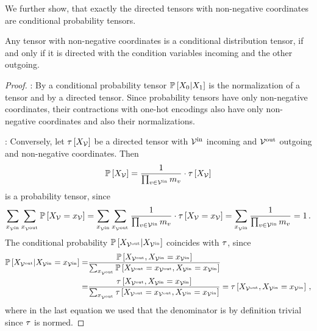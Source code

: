 We further show, that exactly the directed tensors with non-negative coordinates are conditional probability tensors.

\begin{theorem}
    \label{the:conditionalDirected}
    Any tensor with non-negative coordinates is a conditional distribution tensor, if and only if it is directed with the condition variables incoming and the other outgoing.
\end{theorem}
\begin{proof}
    \proofrightsymbol:
    By  a conditional probability tensor $\mathbb{P}\left[X_{0}|X_{1}\right]$ is the normalization of a tensor and by  a directed tensor.
    Since probability tensors have only non-negative coordinates, their contractions with one-hot encodings also have only non-negative coordinates and also their normalizations.

    \proofleftsymbol:
    Conversely, let $\tau\left[X_{\mathcal{V}}\right]$ be a directed tensor with $\mathcal{V}^{\mathrm{in}}$ incoming and $\mathcal{V}^{\mathrm{out}}$ outgoing and non-negative coordinates.
    Then
    \begin{align}
        \mathbb{P}\left[X_{\mathcal{V}}\right] = \frac{1}{\prod_{v\in\mathcal{V}^{\mathrm{in}}}m_{v}} \cdot \tau\left[X_{\mathcal{V}}\right]
    \end{align}
    is a probability tensor, since
    \begin{align*}
        \sum_{x_{\mathcal{V}^{\mathrm{in}}}} \sum_{x_{\mathcal{V}^{\mathrm{out}}}} \mathbb{P}\left[X_{\mathcal{V}}=x_{\mathcal{V}}\right] =
        \sum_{x_{\mathcal{V}^{\mathrm{in}}}} \sum_{x_{\mathcal{V}^{\mathrm{out}}}} \frac{1}{\prod_{v\in\mathcal{V}^{\mathrm{in}}}m_{v}} \cdot \tau\left[X_{\mathcal{V}}=x_{\mathcal{V}}\right] =
        \sum_{x_{\mathcal{V}^{\mathrm{in}}}} \frac{1}{\prod_{v\in\mathcal{V}^{\mathrm{in}}}m_{v}} = 1 \, .
    \end{align*}
    The conditional probability $\mathbb{P}\left[X_{\mathcal{V}^{\mathrm{out}}}|X_{\mathcal{V}^{\mathrm{in}}}\right]$ coincides with $\tau$, since
    \begin{align*}
        \mathbb{P}\left[X_{\mathcal{V}^{\mathrm{out}}}|X_{\mathcal{V}^{\mathrm{in}}}=x_{\mathcal{V}^{\mathrm{in}}}\right]
        =& \frac{
            \mathbb{P}\left[X_{\mathcal{V}^{\mathrm{out}}},X_{\mathcal{V}^{\mathrm{in}}}=x_{\mathcal{V}^{\mathrm{in}}}\right]
        }{
            \sum_{x_{\mathcal{V}^{\mathrm{out}}}} \mathbb{P}\left[X_{\mathcal{V}^{\mathrm{out}}}=x_{\mathcal{V}^{\mathrm{out}}},X_{\mathcal{V}^{\mathrm{in}}}=x_{\mathcal{V}^{\mathrm{in}}}\right]
        } \\
        =& \frac{
            \tau\left[X_{\mathcal{V}^{\mathrm{out}}},X_{\mathcal{V}^{\mathrm{in}}}=x_{\mathcal{V}^{\mathrm{in}}}\right]
        }{
            \sum_{x_{\mathcal{V}^{\mathrm{out}}}} \tau\left[X_{\mathcal{V}^{\mathrm{out}}}=x_{\mathcal{V}^{\mathrm{out}}},X_{\mathcal{V}^{\mathrm{in}}}=x_{\mathcal{V}^{\mathrm{in}}}\right]
        }
        = \tau\left[X_{\mathcal{V}^{\mathrm{out}}},X_{\mathcal{V}^{\mathrm{in}}}=x_{\mathcal{V}^{\mathrm{in}}}\right] \, ,
    \end{align*}
    where in the last equation we used that the denominator is by definition trivial since $\tau$ is normed.
\end{proof}


